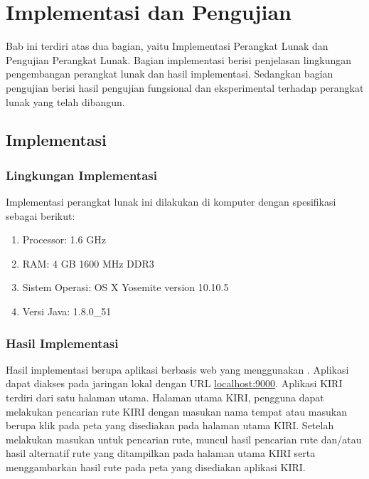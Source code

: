 \chapter{Implementasi dan Pengujian}
\label{chap:implementasiPengujian}

Bab ini terdiri atas dua bagian, yaitu Implementasi Perangkat Lunak dan Pengujian Perangkat Lunak. Bagian implementasi berisi penjelasan lingkungan pengembangan perangkat lunak dan hasil implementasi. Sedangkan bagian pengujian berisi hasil pengujian fungsional dan eksperimental terhadap perangkat lunak yang telah dibangun.

\section{Implementasi}
\label{sec:implementasi}

\subsection{Lingkungan Implementasi}
\label{sec:lingkungan_implementasi}
Implementasi perangkat lunak ini dilakukan di komputer dengan spesifikasi sebagai berikut:
\begin{enumerate}
	\item Processor: 1.6 GHz
	\item RAM: 4 GB 1600 MHz DDR3
	\item Sistem Operasi: OS X Yosemite version 10.10.5
	\item Versi Java: 1.8.0\_51
\end{enumerate}

\subsection{Hasil Implementasi}
Hasil implementasi berupa aplikasi berbasis web yang menggunakan \play. Aplikasi dapat diakses pada jaringan lokal dengan URL \url{localhost:9000}. Aplikasi KIRI terdiri dari satu halaman utama. Halaman utama KIRI, pengguna dapat melakukan pencarian rute KIRI dengan masukan nama tempat atau masukan berupa klik pada peta yang disediakan pada halaman utama KIRI. Setelah melakukan masukan untuk pencarian rute, muncul hasil pencarian rute dan/atau hasil alternatif rute yang ditampilkan pada halaman utama KIRI serta menggambarkan hasil rute pada peta yang disediakan aplikasi KIRI.

